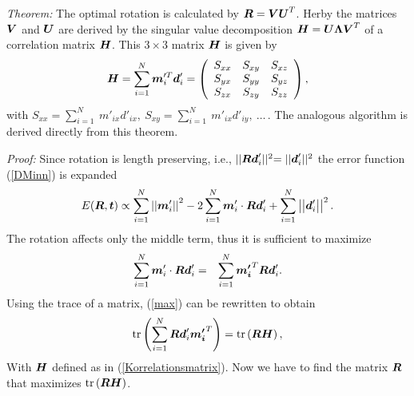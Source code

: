 \documentclass[12pt,dvips]{article}
\renewcommand{\v}[1]{\text{\boldmath $#1$}}
\newcommand{\V}[1]{\text{\boldmath $#1$}}
\newcommand{\M}[1]{\v{#1}}                     %
\newcommand{\norm}[1]{\left | \left | #1 \right | \right |}
\newcommand{\trace}[1]{\mbox{tr}\left( #1 \right)}
\begin{document}
{\noindent \textit{Theorem:} The optimal rotation is calculated
by $\M R = \M V \M U^T$. Herby the matrices $\M V$ and $\M U$ are
derived by the singular value decomposition $\M H = \M U \M
\Lambda \M V^T$ of a correlation matrix $\M H$. This $3 \times 3$ matrix
$\M H$ is given by
\begin{eqnarray}
\M H =  \sum_{i=1}^{N} \V m'^T_i \V d'_i
 =  \left(
\begin{array}{ccc}
S_{xx} & S_{xy} & S_{xz} \\
S_{yx} & S_{yy} & S_{yz} \\
S_{zx} & S_{zy} & S_{zz} \\
\end{array}
\right), \label{Korrelationsmatrix}
\end{eqnarray}
with $S_{xx} = \sum_{i=1}^{N} \ m'_{ix} d'_{ix}, \ S_{xy} =
\sum_{i=1}^{N} \ m'_{ix} d'_{iy}, \ \ldots \, $. The analogous
algorithm is derived directly from this theorem.
\medskip


\textit{Proof:} Since rotation is length preserving, i.e.,
$\lvert\lvert\M R\V d'_i\lvert\lvert^2 = \lvert\lvert \V
d'_i\lvert \lvert^2$ the error function (\ref{DMinn}) is expanded
\begin{eqnarray*}
E(\M R, \V t) \propto
\sum_{i=1}^{N}\norm{\V m'_i}^2
- 2 \sum_{i=1}^{N} \V m'_{i} \cdot \M R
\V d'_i
+ \sum_{i=1}^{N} \norm{\V d'_i}^2.
\end{eqnarray*}
The rotation affects only the middle term, thus it is sufficient
to maximize
\begin{eqnarray}\label{max}
\sum_{i=1}^{N} \V m'_{i} \cdot \M R \V
d'_i
& = &
\sum_{i=1}^{N} \V {m'_{i}}^T  \M R \V
d'_i.
\end{eqnarray}
Using the trace of a matrix, (\ref{max}) can be rewritten to
obtain
\begin{eqnarray*}
\trace{\sum_{i=1}^{N} \M R \V d'_i \V {m'_{i}}^T } =
\trace{\M R \M H},
\end{eqnarray*}
With $\M H$ defined as in (\ref{Korrelationsmatrix}). Now we have
to find the matrix $\M R$ that maximizes $\trace{\M R \M H}$.

}
\end{document}
